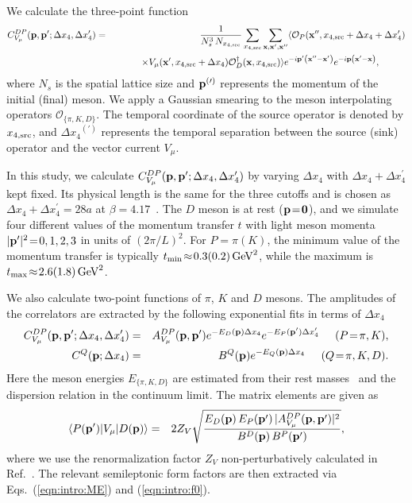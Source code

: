 \documentclass{PoS}
\newcommand{\bea}{\begin{eqnarray}}
\newcommand{\eea}{\end{eqnarray}}
\newcommand{\nn}{\nonumber}
\newcommand{\calO}{{\mathcal O}}
\newcommand{\bfp}{{\bf p}}
\newcommand{\bfpp}{{{\bf p}^\prime}}
\newcommand{\bfx}{{\bf x}}
\newcommand{\bfxp}{{{\bf x}^\prime}}
\newcommand{\bfxpp}{{{\bf x}^{\prime\prime}}}
\newcommand{\bfz}{{\bf 0}}
\newcommand{\dt}{{\Delta x_4}}
\newcommand{\dtp}{{\Delta x_4^\prime}}
\newcommand{\tsrc}{{x_{4,\rm src}}}
\begin{document}
We calculate the three-point function
\bea
    C^{DP}_{V_\mu}
    (\bfp,\bfp^\prime;\dt,\dtp)
    & = &
    \frac{1}{N_s^3\,N_\tsrc}
    \sum_{\tsrc}
    \sum_{\bfx,\bfxp,\bfxpp} 
    \langle 
       {\calO}_P(\bfxpp,\tsrc+\dt+\dtp) 
    \nn \\
    &&
    \hspace{10mm}
       \times
       V_\mu(\bfxp,\tsrc+\dt)
       {\calO}_D^{\dagger}(\bfx,\tsrc)
    \rangle
    e^{-i\bfpp\left( \bfxpp - \bfxp \right)}
    e^{-i\bfp\left( \bfxp - \bfx \right)},
    \hspace{10mm}
    \label{eqn:sim:msn_corr:msn_corr_3pt}  
\eea
where 
$N_s$ is the spatial lattice size and 
$\bfp^{(\prime)}$ represents the momentum of the initial (final) meson.
We apply a Gaussian smearing to the meson interpolating operators
${\calO}_{\{\pi,K,D\}}$.
The temporal coordinate of the source operator is denoted by $\tsrc$,
and $\dt^{(\prime)}$ represents 
the temporal separation between the source (sink) operator 
and the vector current $V_\mu$.



In this study,
we calculate $C^{DP}_{V_\mu}(\bfp,\bfp^\prime;\dt,\dtp)$ 
by varying $\dt$ with $\dt\!+\!\dtp$ kept fixed. 
Its physical length is the same for the three cutoffs 
and is chosen as $\dt\!+\!\dtp\!=\!28a$ at $\beta\!=\!4.17$~\cite{Lat15:Suzuki}.
%
The $D$ meson is at rest ($\bfp\!=\!\bfz$),
and we simulate four different values of the momentum transfer $t$
with light meson momenta $|\bfpp|^2\!=\!0,1,2,3$ in units of $(2\pi/L)^2$.
For $P\!=\!\pi(K)$,
the minimum value of the momentum transfer is typically 
$t_{\rm min}\!\approx\!0.3(0.2)\,\mbox{GeV}^2$,
while the maximum is $t_{\rm max}\!\approx\!2.6(1.8)\,\mbox{GeV}^2$.



We also calculate two-point functions of $\pi$, $K$ and $D$ mesons.
The amplitudes of the correlators are extracted
by the following exponential fits in terms of $\dt$ 
\bea
   C_{V_\mu}^{DP}(\bfp,\bfpp;\dt,\dtp)
   & = &
   A_{V_\mu}^{DP}(\bfp,\bfpp) e^{-E_D(\bfp)\dt}e^{-E_P(\bfpp)\dtp}
   \hspace{5mm}
   (P\!=\!\pi,K),
   \\ 
   C^Q(\bfp;\dt)
   & = &
   B^Q(\bfp) e^{-E_Q(\bfp)\dt}
   \hspace{5mm}
   (Q\!=\!\pi,K,D).
   \label{eqn:amp}
\eea
Here the meson energies $E_{\{\pi,K,D\}}$ are estimated
from their rest masses~\cite{Lat15:Fahy}
and the dispersion relation in the continuum limit.
%
The matrix elements are given as
\bea
   \langle P(\bfpp) | V_\mu | D(\bfp) \rangle
   & = &
   2 Z_V
   \sqrt{
      \frac{ E_D(\bfp)\,E_P(\bfpp)\, |A_{V_\mu}^{DP}(\bfp,\bfpp)|^2 }
           { B^D(\bfp)\,B^P(\bfpp) }
   },
\eea
where we use the renormalization factor $Z_V$
non-perturbatively calculated in Ref.~\cite{NPR:JLQCD}.
The relevant semileptonic form factors are then extracted
via Eqs.~(\ref{eqn:intro:ME}) and (\ref{eqn:intro:f0}).
\end{document}
